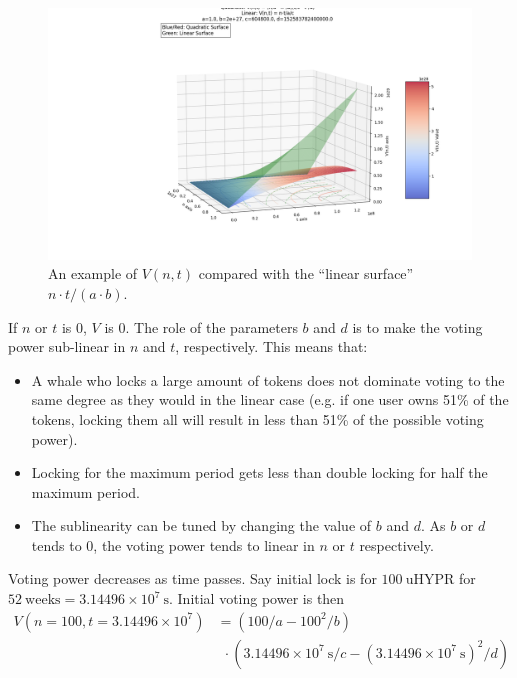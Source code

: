 \documentclass{article}
\begin{document}
\begin{figure}[h]
    \centering
    \includegraphics[width=\textwidth]{voting-power-surface.png}
    \caption{An example of $V(n, t)$ compared with the ``linear surface'' $n\cdot t / (a\cdot b)$.}
    \label{fig:voting-power}
\end{figure}

If $n$ or $t$ is $0$, $V$ is $0$.
The role of the parameters $b$ and $d$ is to make the voting power sub-linear in $n$ and $t$, respectively.
This means that:
\begin{itemize}
    \item A whale who locks a large amount of tokens does not dominate voting to the same degree as they would in the linear case (e.g. if one user owns 51\% of the tokens, locking them all will result in less than 51\% of the possible voting power).
    \item Locking for the maximum period gets less than double locking for half the maximum period.
    \item The sublinearity can be tuned by changing the value of $b$ and $d$.
      As $b$ or $d$ tends to $0$, the voting power tends to linear in $n$ or $t$ respectively.
\end{itemize}

Voting power decreases as time passes.
Say initial lock is for $100~\text{uHYPR}$ for $52~\text{weeks} = 3.14496 \times 10^7~\text{s}$.
Initial voting power is then
\begin{equation}
\begin{aligned}
V(n=100, t=3.14496 \times 10^7) &= (100/a - 100^2/b) \\
	&~~ \cdot (3.14496 \times 10^7~\text{s} /c - (3.14496 \times 10^7~\text{s})^2/d)
\end{aligned}
\end{equation}
\end{document}
